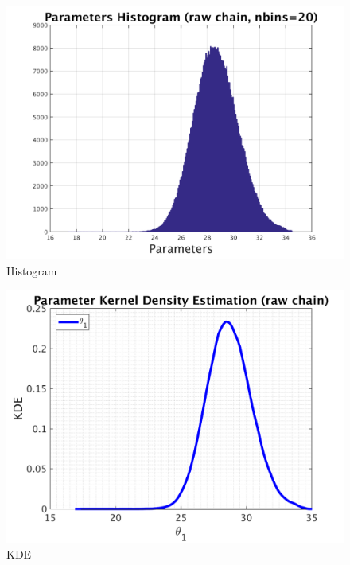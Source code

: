 \begin{figure}[H]
  
  \centering
   \includegraphics[scale=0.75]{53_results/output_500/simple_ip_hist_raw}
   \caption{Histogram}
\end{figure}



\begin{figure}[H]
  
  \centering
   \includegraphics[scale=0.75]{53_results/output_500/simple_ip_kde_raw}
   \caption{ KDE }
\end{figure}

